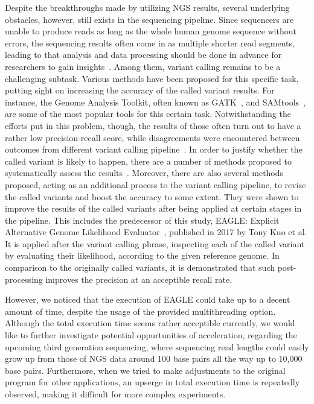 \documentclass{PHlab-thesis}
\begin{document}
Despite the breakthroughs made by utilizing NGS results, several underlying obstacles, however, still exists in the sequencing pipeline. Since sequencers are unable to produce reads as long as the whole human genome sequence without errors, the sequencing results often come in as multiple shorter read segments, leading to that analysis and data processing should be done in advance for researchers to gain insights~\cite{muzzey2015understanding}. Among them, variant calling remains to be a challenging subtask. Various methods have been proposed for this specific task, putting sight on increasing the accuracy of the called variant results. For instance, the Genome Analysis Toolkit, often known as GATK~\cite{mckenna2010genome}, and SAMtools~\cite{li2009sequence}, are some of the most popular tools for this certain task. Notwithstanding the efforts put in this problem, though, the results of those often turn out to have a rather low  precision-recall score, while disagreements were encountered between outcomes from different variant calling pipeline~\cite{o2013low}. In order to justify whether the called variant is likely to happen, there are a number of methods proposed to systematically assess the results~\cite{hwang2015systematic,yu2013comparing}. Moreover, there are also several methods proposed, acting as an additional process to the variant calling pipeline, to revise the called variants and boost the accuracy to some extent. They were shown to improve the results of the called variants after being applied at certain stages in the pipeline. This includes the predecessor of this study, EAGLE: Explicit Alternative Genome Likelihood Evaluator~\cite{kuo2018eagle}, published in 2017 by Tony Kuo et al. It is applied after the variant calling phrase, inspecting each of the called variant by evaluating their likelihood, according to the given reference genome. In comparison to the originally called variants, it is demonstrated that such post-processing improves the precision at an acceptible recall rate.

However, we noticed that the execution of EAGLE could take up to a decent amount of time, despite the usage of the provided multithreading option. Although the total execution time seems rather acceptible currently, we would like to further investigate potential oppurtunities of acceleration, regarding the upcoming third generation sequencing, where sequencing read lengths could easily grow up from those of NGS data around 100 base pairs all the way up to 10,000 base pairs. Furthermore, when we tried to make adjustments to the original program for other applications, an upserge in total execution time is repeatedly observed, making it difficult for more complex experiments.
\end{document}
